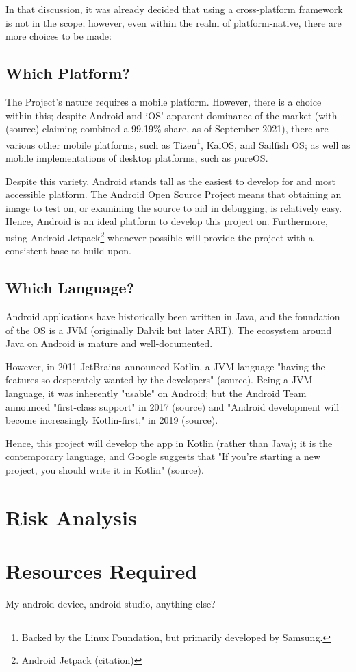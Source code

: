 \documentclass[11pt, a4paper, notitlepage]{report}
\begin{document}
In that discussion, it was already decided that using a cross-platform 
framework is not in the scope; however, even within the realm of 
platform-native, there are more choices to be made:
\subsection{Which Platform?}
The Project's nature requires a mobile platform. However, there is a choice 
within this; despite Android and iOS' apparent dominance of the market (with 
(source) claiming combined a 99.19\% share, as of September 2021), there 
are various other mobile platforms, such as Tizen\footnote{Backed by the Linux 
Foundation, but primarily developed by Samsung.}, KaiOS, and Sailfish OS; as 
well as mobile implementations of desktop platforms, such as pureOS.

Despite this variety, Android stands tall as the easiest to develop for and 
most accessible platform. The Android Open Source Project means that obtaining 
an image to test on, or examining the source to aid in debugging, is relatively 
easy. Hence, Android is an ideal platform to develop this project on. 
Furthermore, using Android Jetpack\footnote{Android Jetpack (citation)} 
whenever possible will provide the project with a consistent base to build upon.

\subsection{Which Language?}
Android applications have historically been written in Java, and the foundation 
of the OS is a JVM (originally Dalvik but later ART). The ecosystem around Java 
on Android is mature and well-documented.

However, in 2011 JetBrains\texttrademark\ announced Kotlin, a JVM language 
"having the features so desperately wanted by the developers" (source). Being a 
JVM language, it was inherently "usable" on Android; but the Android Team 
announced "first-class support" in 2017 (source) and "Android development will 
become increasingly Kotlin-first," in 2019 (source).

Hence, this project will develop the app in Kotlin (rather than Java); it is 
the contemporary language, and Google suggests that "If you’re starting a new 
project, you should write it in Kotlin" (source).

\section{Risk Analysis}
\section{Resources Required}
My android device, android studio, anything else?
\end{document}
